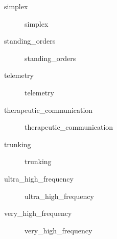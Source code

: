 \documentclass[../../EMT-169.tex]{subfiles}
\begin{document}
\begin{description}
	\item [\gls{simplex}]        					\glsdesc{simplex}
	\item [\gls{standing_orders}]        			\glsdesc{standing_orders}
	\item [\gls{telemetry}]        					\glsdesc{telemetry}
	\item [\gls{therapeutic_communication}]        	\glsdesc{therapeutic_communication}
	\item [\gls{trunking}]        					\glsdesc{trunking}
	\item [\gls{ultra_high_frequency}]       		\glsdesc{ultra_high_frequency}
	\item [\gls{very_high_frequency}]        		\glsdesc{very_high_frequency}
\end{description}\hfill \\


\clearpage
\end{document}
